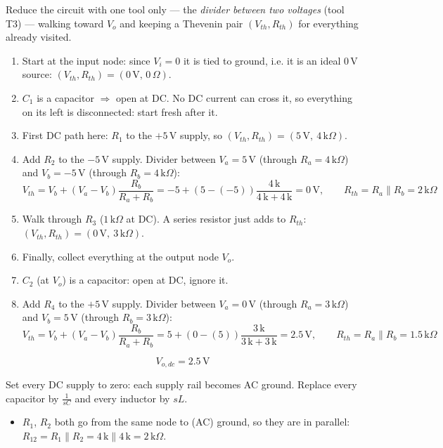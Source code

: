 \documentclass[11pt]{article}
\newcommand{\solstep}[2]{\par\medskip{\color{stepc}\textbf{Step #1 --- #2}}\par\nopagebreak}
\begin{document}
Reduce the circuit with one tool only --- the \emph{divider between two voltages} (tool T3) --- walking toward $V_o$ and keeping a Thevenin pair $(V_{th},R_{th})$ for everything already visited.
\begin{enumerate}[leftmargin=*,itemsep=2pt]
\item Start at the input node: since $V_i=0$ it is tied to ground, i.e. it is an ideal $0\,\mathrm{V}$ source: $(V_{th},R_{th})=(0\,\mathrm{V},\,0\,\Omega)$.
\item $C_{1}$ is a capacitor $\Rightarrow$ open at DC. No DC current can cross it, so everything on its left is disconnected: start fresh after it.
\item First DC path here: $R_{1}$ to the $+5\,\mathrm{V}$ supply, so $(V_{th},R_{th}) = (5\,\mathrm{V},\ 4\,\mathrm{k}\Omega)$.
\item Add $R_{2}$ to the $-5\,\mathrm{V}$ supply. Divider between $V_a=5\,\mathrm{V}$ (through $R_a=4\,\mathrm{k}\Omega$) and $V_b=-5\,\mathrm{V}$ (through $R_b=4\,\mathrm{k}\Omega$):\[
V_{th} = V_b + (V_a-V_b)\frac{R_b}{R_a+R_b} = -5 + \left(5 - (-5)\right)\frac{4\,\mathrm{k}}{4\,\mathrm{k} + 4\,\mathrm{k}} = 0\,\mathrm{V},\qquad R_{th} = R_a\parallel R_b = 2\,\mathrm{k}\Omega
\]

\item Walk through $R_{3}$ ($1\,\mathrm{k}\Omega$ at DC). A series resistor just adds to $R_{th}$: $(V_{th},R_{th}) = (0\,\mathrm{V},\ 3\,\mathrm{k}\Omega)$.
\item Finally, collect everything at the output node $V_o$.
\item $C_{2}$ (at $V_{o}$) is a capacitor: open at DC, ignore it.
\item Add $R_{4}$ to the $+5\,\mathrm{V}$ supply. Divider between $V_a=0\,\mathrm{V}$ (through $R_a=3\,\mathrm{k}\Omega$) and $V_b=5\,\mathrm{V}$ (through $R_b=3\,\mathrm{k}\Omega$):\[
V_{th} = V_b + (V_a-V_b)\frac{R_b}{R_a+R_b} = 5 + \left(0 - (5)\right)\frac{3\,\mathrm{k}}{3\,\mathrm{k} + 3\,\mathrm{k}} = 2.5\,\mathrm{V},\qquad R_{th} = R_a\parallel R_b = 1.5\,\mathrm{k}\Omega
\]

\end{enumerate}

\[
\boxed{V_{o,dc} = 2.5\,\mathrm{V}}
\]

\solstep{3}{AC circuit}Set every DC supply to zero: each supply rail becomes AC ground. Replace every capacitor by $\frac{1}{sC}$ and every inductor by $sL$.
\begin{itemize}[leftmargin=*,itemsep=2pt]
\item $R_{1}$, $R_{2}$ both go from the same node to (AC) ground, so they are in parallel: $R_{12} = R_{1} \parallel R_{2} = 4\,\mathrm{k} \parallel 4\,\mathrm{k} = 2\,\mathrm{k}\Omega$.
\end{itemize}
\end{document}
